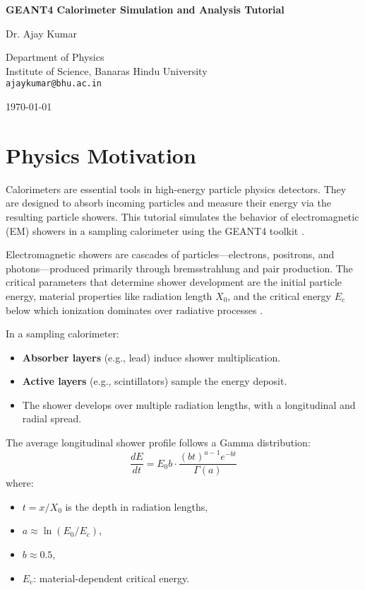 \documentclass[11pt]{article}
\begin{document}
\begin{titlepage}
  \centering
  \vspace*{2cm}

  {\LARGE \bfseries GEANT4 Calorimeter Simulation and Analysis Tutorial \par}
  \vspace{1.5cm}

  {\Large Dr. Ajay Kumar\par}
  \vspace{0.5cm}
  Department of Physics\\
  Institute of Science, Banaras Hindu University\\
  \texttt{ajaykumar@bhu.ac.in}

  \vfill

  {\large \today\par}
\end{titlepage}

\section{Physics Motivation}

Calorimeters are essential tools in high-energy particle physics detectors. They are designed to absorb incoming particles and measure their energy via the resulting particle showers. This tutorial simulates the behavior of electromagnetic (EM) showers in a sampling calorimeter using the GEANT4 toolkit \cite{geant4_manual}.

Electromagnetic showers are cascades of particles—electrons, positrons, and photons—produced primarily through bremsstrahlung and pair production. The critical parameters that determine shower development are the initial particle energy, material properties like radiation length \( X_0 \), and the critical energy \( E_c \) below which ionization dominates over radiative processes \cite{pdg_calorimetry}.

In a sampling calorimeter:
\begin{itemize}
  \item \textbf{Absorber layers} (e.g., lead) induce shower multiplication.
  \item \textbf{Active layers} (e.g., scintillators) sample the energy deposit.
  \item The shower develops over multiple radiation lengths, with a longitudinal and radial spread.
\end{itemize}

The average longitudinal shower profile follows a Gamma distribution:
\begin{equation}
\frac{dE}{dt} = E_0 b \cdot \frac{(bt)^{a-1}e^{-bt}}{\Gamma(a)}
\end{equation}
where:
\begin{itemize}
    \item \( t = x / X_0 \) is the depth in radiation lengths,
    \item \( a \approx \ln(E_0 / E_c) \),
    \item \( b \approx 0.5 \),
    \item \( E_c \): material-dependent critical energy.
\end{itemize}
\end{document}
